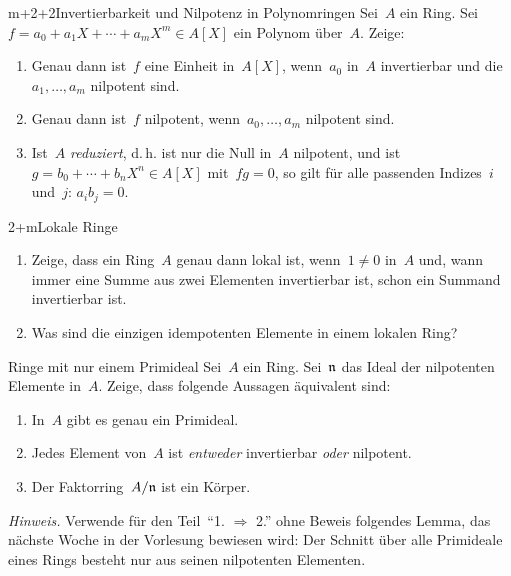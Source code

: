 \documentclass{uebblatt}
\begin{document}

\begin{aufgabe}{m+2+2}{Invertierbarkeit und Nilpotenz in Polynomringen}
Sei~$A$ ein Ring. Sei~$f = a_0 + a_1 X + \cdots + a_m X^m \in A[X]$ ein Polynom
über~$A$. Zeige:
\begin{enumerate}
\item Genau dann ist~$f$ eine Einheit in~$A[X]$, wenn~$a_0$ in~$A$ invertierbar
und die~$a_1,\ldots,a_m$ nilpotent sind.
\item Genau dann ist~$f$ nilpotent, wenn~$a_0,\ldots,a_m$ nilpotent sind.
\item Ist~$A$ \emph{reduziert}, d.\,h. ist nur die Null in~$A$ nilpotent,
und ist~$g = b_0 + \cdots + b_n X^n \in A[X]$ mit~$fg = 0$, so gilt für alle passenden Indizes~$i$ und~$j$: $a_i b_j = 0$.
\end{enumerate}
\end{aufgabe}

\begin{aufgabe}{2+m}{Lokale Ringe}
\begin{enumerate}
\item Zeige, dass ein Ring~$A$ genau dann lokal ist,
wenn~$1 \neq 0$ in~$A$ und, wann immer eine Summe aus zwei Elementen
invertierbar ist, schon ein Summand invertierbar ist.
\item Was sind die einzigen idempotenten Elemente in einem lokalen Ring?
\end{enumerate}
\end{aufgabe}

\begin{aufgabe}{4}{Ringe mit nur einem Primideal}
Sei~$A$ ein Ring. Sei~$\mathfrak{n}$ das Ideal der nilpotenten Elemente in~$A$. Zeige, dass folgende
Aussagen äquivalent sind:
\begin{enumerate}
\item[1.] In~$A$ gibt es genau ein Primideal.
\item[2.] Jedes Element von~$A$ ist \emph{entweder} invertierbar \emph{oder}
nilpotent.
\item[3.] Der Faktorring~$A/\mathfrak{n}$ ist ein Körper.
\end{enumerate}
{\scriptsize\emph{Hinweis.} Verwende für den Teil~"`1. $\Rightarrow$ 2."' ohne
Beweis folgendes Lemma, das nächste Woche in der Vorlesung bewiesen wird: Der
Schnitt über alle Primideale eines Rings besteht nur aus seinen nilpotenten
Elementen.\par}
\end{aufgabe}
\enlargethispage{1.8em}
\end{document}
